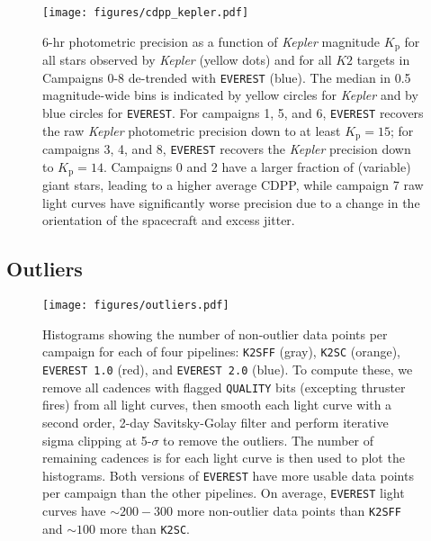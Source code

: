 \documentclass[]{emulateapj}
\newcommand{\Kp}{\ensuremath{K_\mathrm{p}}}
\begin{document}
\begin{figure*}[t]
  \begin{center}
      \leavevmode
      \texttt{[image: figures/cdpp\_kepler.pdf]}
       \caption{6-hr photometric precision as a function of \emph{Kepler} magnitude $\Kp$ for all 
       stars observed by \emph{Kepler} (yellow dots) and for all $K2$ targets in Campaigns 0-8
       de-trended with \texttt{EVEREST} (blue). The median in 0.5 magnitude-wide bins is indicated
       by yellow circles for \emph{Kepler} and by blue circles for \texttt{EVEREST}. For campaigns
       1, 5, and 6, \texttt{EVEREST} recovers the raw \emph{Kepler} photometric precision down to
       at least $\Kp = 15$; for campaigns 3, 4, and 8, \texttt{EVEREST} recovers the \emph{Kepler} 
       precision down to $\Kp = 14$. Campaigns 0 and 2 have a larger fraction of (variable) giant
       stars, leading to a higher average CDPP, while campaign 7 raw light curves have significantly
       worse precision due to a change in the orientation of the spacecraft and excess jitter.
       }
     \label{fig:cdpp_kepler}
  \end{center}
\end{figure*}

\subsection{Outliers}

\begin{figure}[ht]
  \begin{center}
      \texttt{[image: figures/outliers.pdf]}
       \caption{Histograms showing the number of non-outlier data points per campaign for each
        of four pipelines: \texttt{K2SFF} (gray), \texttt{K2SC} (orange), \texttt{EVEREST 1.0}
        (red), and \texttt{EVEREST 2.0} (blue). To compute these, we remove all cadences 
        with flagged \texttt{QUALITY} bits (excepting thruster fires) from all light curves, then
        smooth each light curve with a second order, 2-day Savitsky-Golay filter and perform iterative 
        sigma clipping at 5-$\sigma$ to remove the outliers. The number of remaining cadences is
        for each light curve is then used to plot the histograms. Both versions of \texttt{EVEREST}
        have more usable data points per campaign than the other pipelines. On average, 
        \texttt{EVEREST} light curves have ${\sim}200-300$ more non-outlier data points than \texttt{K2SFF} 
        and ${\sim}100$ more than \texttt{K2SC}.}
     \label{fig:outliers}
  \end{center}
\end{figure}
\end{document}
